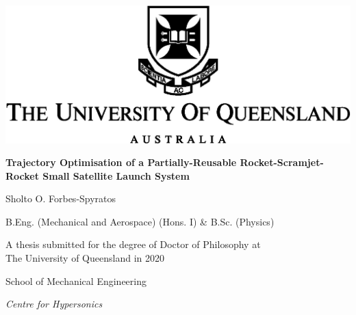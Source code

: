 




\thispagestyle{empty}
\begin{center}
	\centering
  \includegraphics{figures/uq_logo}

  \vspace{50pt}

  \textbf{\Large Trajectory Optimisation of a Partially-Reusable Rocket-Scramjet-Rocket Small Satellite Launch System}

  \vspace{25pt}

  {\large Sholto O. Forbes-Spyratos }
    
    \vspace{5pt}

  {\large B.Eng. (Mechanical and Aerospace) (Hons. I) \& B.Sc. (Physics)}


  \vspace{60pt}
                                                                                                                                                                                                                                                                                                                                                                                                                                                                                                                                                                                                                                                                                                                                                                                                                                                                                                                                                                                                                                                 
  \vfill

  {\large A thesis submitted for the degree of Doctor of Philosophy at\\ The University of Queensland in 2020}

  \vspace{20pt}

  School of Mechanical Engineering
  
  \textit{Centre for Hypersonics}

  \vfill
\end{center}


